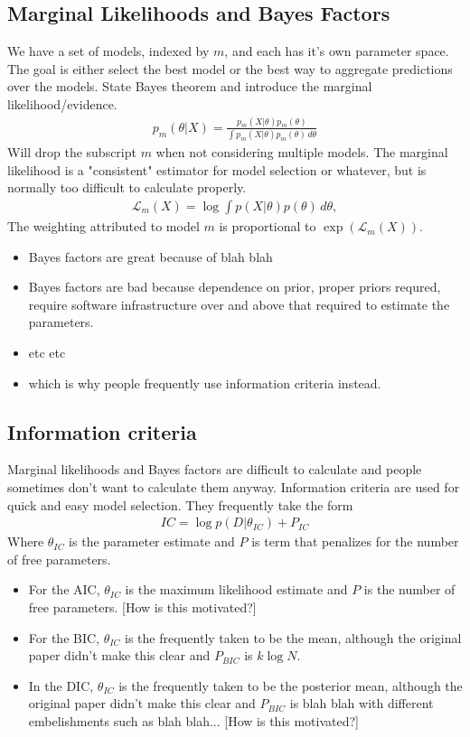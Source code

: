 \documentclass[10pt,a4paper]{article}
\begin{document}
\subsection{Marginal Likelihoods and Bayes Factors}
We have a set of models, indexed by $m$, and each has it's own parameter space. The goal is either select the best model or the best way to aggregate predictions over the models. 
State Bayes theorem and introduce the marginal likelihood/evidence.
\begin{align}
p_m(\theta | X) =  \frac{p_m(X|\theta) p_m(\theta)}{ \int p_m(X|\theta) p_m(\theta) \, d\theta}
\end{align}
Will drop the subscript $m$ when not considering multiple models.
The marginal likelihood is a "consistent" estimator for model selection or whatever, but is normally too difficult to calculate properly. 
\begin{align}
\mathcal{L}_m(X) = \log \int p(X|\theta) p(\theta)  \, d\theta,
\end{align}
The weighting attributed to model $m$ is proportional to $\exp(\mathcal{L}_m(X))$.
\begin{itemize}
\item Bayes factors are great because of blah blah
\item Bayes factors are bad because dependence on prior, proper priors requred, require software infrastructure over and above that required to estimate the parameters.
\item etc etc
\item which is why people frequently use information criteria instead.
\end{itemize}

\subsection{Information criteria}
Marginal likelihoods and Bayes factors are difficult to calculate and people sometimes don't want to calculate them anyway. Information criteria are used for quick and easy model selection. They frequently take the form
\begin{align}
IC  = \log p(D|\theta_{IC}) + P_{IC}
\label{eq:inf_crit}
\end{align}
Where $\theta_{IC}$ is the parameter estimate and $P$ is term that penalizes for the number of free parameters. 
\begin{itemize}
\item For the AIC, $\theta_{IC}$ is the maximum likelihood estimate and $P$ is the number of free parameters. [How is this motivated?]
\item For the BIC, $\theta_{IC}$ is the frequently taken to be the mean, although the original paper didn't make this clear and $P_{BIC}$ is $k\log N$.
\item In the DIC, $\theta_{IC}$ is the frequently taken to be the posterior mean, although the original paper didn't make this clear and $P_{BIC}$ is blah blah with different embelishments such as blah blah... [How is this motivated?]
\end{itemize}
\end{document}
